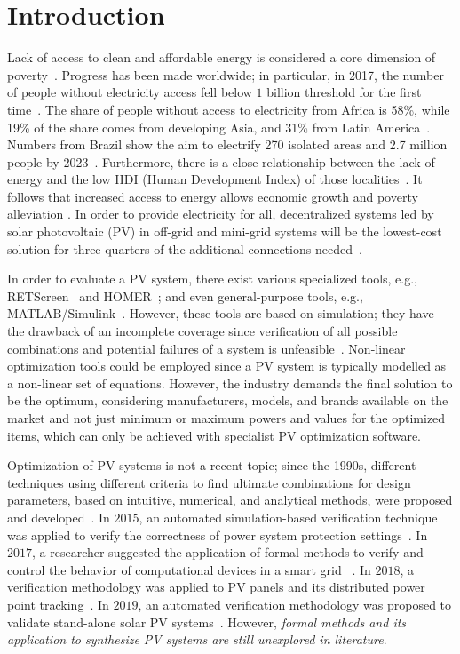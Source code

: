 \documentclass[runningheads]{llncs}
\begin{document}
\section{Introduction}
Lack of access to clean and affordable energy is considered a core dimension of poverty~\cite{Hussein2012}. Progress has been made worldwide; in particular, in 2017, the number of people without electricity access fell below $1$ billion threshold for the first time~\cite{IEAweo2018}. The share of people without access to electricity from Africa is 58\%, while 19\% of the share comes from developing Asia, and 31\% from Latin America~\cite{IEAweo2018}. Numbers from Brazil show the aim to electrify 270 isolated areas and 2.7 million people by 2023~\cite{EPE2018}. 
Furthermore, there is a close relationship between the lack of energy and the low HDI (Human Development Index) of those localities~\cite{Coelho}. It follows that increased access to energy allows economic growth and poverty alleviation \cite{Karekesi}. In order to provide electricity for all, decentralized systems led by solar photovoltaic (PV) in off-grid and mini-grid systems will be the lowest-cost solution for three-quarters of the additional connections needed~\cite{Hussein2012}. 

In order to evaluate a PV system, there exist various specialized tools, e.g., RETScreen~\cite{Pradhan} and HOMER~\cite{Swarnkar}; and even general-purpose tools, e.g., MATLAB/Simulink~\cite{Gow1999}. However, these tools are based on simulation; they have the drawback of an incomplete coverage since verification of all possible combinations and potential failures of a system is unfeasible~\cite{ClarkeHV18}. Non-linear optimization tools could be employed since a PV system is typically modelled as a non-linear set of equations. However, the industry demands the final solution to be the optimum, considering manufacturers, models, and brands available on the market and not just minimum or maximum powers and values for the optimized items, which can only be achieved with specialist PV optimization software.

Optimization of PV systems is not a recent topic; since the 1990s, different techniques using different criteria to find ultimate combinations for design parameters, based on intuitive, numerical, and analytical methods, were proposed and developed~\cite{Alsadi2018}. In $2015$, an automated simulation-based verification technique was applied to verify the correctness of power system protection settings~\cite{Sengupta2015}. In $2017$, a researcher suggested the application of formal methods to verify and control the behavior of computational devices in a smart grid ~\cite{Abate2017}. In $2018$, a verification methodology was applied to PV panels and its distributed power point tracking~\cite{Driouich2018}. In $2019$, an automated verification methodology was proposed to validate stand-alone solar PV systems~\cite{TrindadeCordeiro19}. However, \textit{formal methods and its application to synthesize PV systems are still unexplored in literature}.
\end{document}

